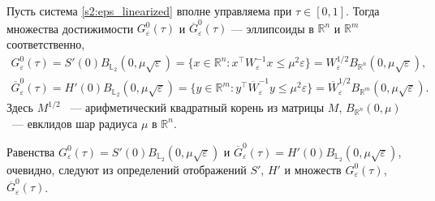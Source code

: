 \documentclass[../main.tex]{subfiles}
\begin{document}
\begin{lemma}
	Пусть система \eqref{s2:eps_linearized} вполне управляема при $\tau \in [0,1]$. 
	Тогда множества достижимости $G^0_{\varepsilon}(\tau)$ и $\overline{G}^0_{\varepsilon}(\tau)$ --- эллипсоиды в $\mathbb{R}^n$ и $\mathbb{R}^m$ соответственно,
	\begin{gather*}
		 G^0_{\varepsilon}(\tau) = S'(0) B_{\mathbb{L}_2}(0,\mu\sqrt{\varepsilon}) = \{ x \in \mathbb{R}^n: x^{\top} W^{-1}_{\varepsilon} x \leqslant \mu^2 \varepsilon \} = W^{1/2}_{\varepsilon} B_{\mathbb{R}^n}(0,\mu\sqrt{\varepsilon}), \\
		 \overline{G}^0_{\varepsilon}(\tau) = H'(0) B_{\mathbb{L}_2}(0,\mu\sqrt{\varepsilon}) = \{ y \in \mathbb{R}^m: y^{\top} \overline{W}^{-1}_{\varepsilon} y \leqslant \mu^2 \varepsilon \} = \overline{W}^{1/2}_{\varepsilon} B_{\mathbb{R}^m}(0,\mu\sqrt{\varepsilon}).
	\end{gather*}
	Здесь $M^{1/2}$ ~--- арифметический квадратный корень из матрицы $M$, $ B_{\mathbb{R}^n}(0,\mu) $ ~--- евклидов шар радиуса $ \mu $ в $ \mathbb{R}^n $.
\end{lemma}
\doc
Равенства $G^0_{\varepsilon}(\tau) = S'(0) B_{\mathbb{L}_2}(0,\mu\sqrt{\varepsilon})$ и $ \overline{G}^0_{\varepsilon}(\tau) = H'(0) B_{\mathbb{L}_2}(0,\mu\sqrt{\varepsilon}) $, очевидно, следуют из определений отображений $ S' $, $ H' $ и множеств $ G^0_{\varepsilon}(\tau)$, $ \overline{G}^0_{\varepsilon}(\tau)$.
\end{document}
